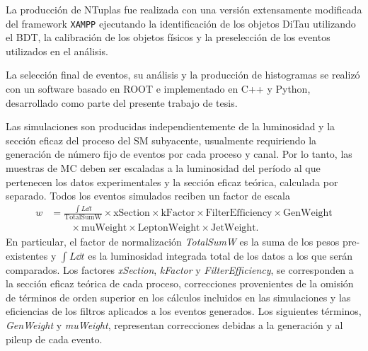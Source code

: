 La producción de NTuplas fue realizada con una versión extensamente modificada del framework \texttt{XAMPP} ejecutando la identificación de los objetos DiTau utilizando el BDT, la calibración de los objetos físicos y la preselección de los eventos utilizados en el análisis.

La selección final de eventos, su análisis y la producción de histogramas se realizó con un software basado en ROOT e implementado en C++ y Python, desarrollado como parte del presente trabajo de tesis.

Las simulaciones son producidas independientemente de la luminosidad y la sección eficaz del proceso del SM subyacente, usualmente requiriendo la generación de número fijo de eventos por cada proceso y canal. Por lo tanto, las muestras de MC deben ser escaladas a la luminosidad del período al que pertenecen los datos experimentales y la sección eficaz teórica, calculada por separado. Todos los eventos simulados reciben un factor de escala
\begin{align}
    w &= \frac{\int L \dd{t}}{\text{TotalSumW}} \times \text{xSection} \times \text{kFactor} \times \text{FilterEfficiency} \times \text{GenWeight} \nonumber \\
        &\quad\quad \times \text{muWeight} \times \text{LeptonWeight} \times \text{JetWeight}. \label{eq:ch4:weight}
\end{align}
En particular, el factor de normalización \textit{TotalSumW} es la suma de los pesos pre-existentes y $\int L \dd{t}$ es la luminosidad integrada total de los datos a los que serán comparados. Los factores \textit{xSection}, \textit{kFactor} y \textit{FilterEfficiency}, se corresponden a la sección eficaz teórica de cada proceso, correcciones provenientes de la omisión de términos de orden superior en los cálculos incluidos en las simulaciones y las eficiencias de los filtros aplicados a los eventos generados. Los siguientes términos, \textit{GenWeight} y \textit{muWeight}, representan correcciones debidas a la generación y al pileup de cada evento.

